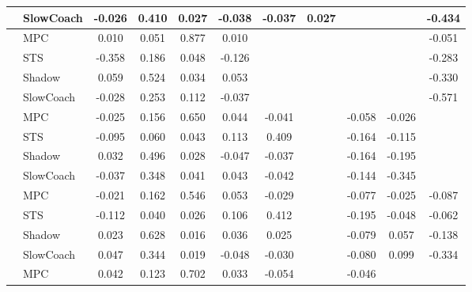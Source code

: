 \begin{tabular}{|l|l|*{9}{c|}}
                                                           & SlowCoach &   -0.026 &     0.410 &     0.027 & -0.038 & -0.037 &  0.027 &      &      &   -0.434 \\
\midrule
[True, True, True, True, False, False, False, False, True] & MPC &    0.010 &     0.051 &     0.877 &  0.010 &     &     &      &      &   -0.051 \\
                                                           & STS &   -0.358 &     0.186 &     0.048 & -0.126 &     &     &      &      &   -0.283 \\
                                                           & Shadow &    0.059 &     0.524 &     0.034 &  0.053 &     &     &      &      &   -0.330 \\
                                                           & SlowCoach &   -0.028 &     0.253 &     0.112 & -0.037 &     &     &      &      &   -0.571 \\
\midrule
[True, True, True, True, True, False, True, True, False] & MPC &   -0.025 &     0.156 &     0.650 &  0.044 & -0.041 &     &  -0.058 &  -0.026 &       \\
                                                           & STS &   -0.095 &     0.060 &     0.043 &  0.113 &  0.409 &     &  -0.164 &  -0.115 &       \\
                                                           & Shadow &    0.032 &     0.496 &     0.028 & -0.047 & -0.037 &     &  -0.164 &  -0.195 &       \\
                                                           & SlowCoach &   -0.037 &     0.348 &     0.041 &  0.043 & -0.042 &     &  -0.144 &  -0.345 &       \\
\midrule
[True, True, True, True, True, False, True, True, True] & MPC &   -0.021 &     0.162 &     0.546 &  0.053 & -0.029 &     &  -0.077 &  -0.025 &   -0.087 \\
                                                           & STS &   -0.112 &     0.040 &     0.026 &  0.106 &  0.412 &     &  -0.195 &  -0.048 &   -0.062 \\
                                                           & Shadow &    0.023 &     0.628 &     0.016 &  0.036 &  0.025 &     &  -0.079 &   0.057 &   -0.138 \\
                                                           & SlowCoach &    0.047 &     0.344 &     0.019 & -0.048 & -0.030 &     &  -0.080 &   0.099 &   -0.334 \\
\midrule
[True, True, True, True, True, False, True, False, False] & MPC &    0.042 &     0.123 &     0.702 &  0.033 & -0.054 &     &  -0.046 &      &       \\

\end{tabular}
